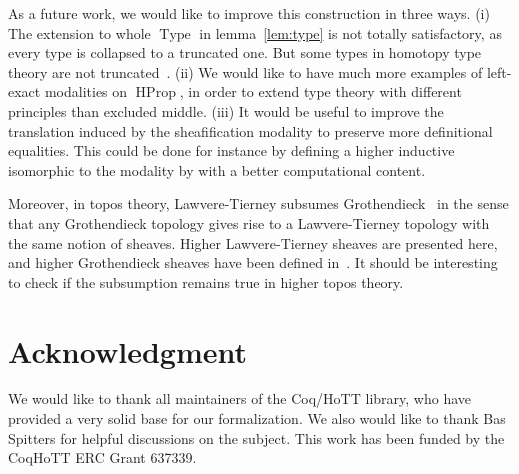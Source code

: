 \documentclass[preprint,9pt,numbers]{sigplanconf}
\newcommand{\mynote}[2]{
    \fbox{\bfseries\sffamily\scriptsize#1}
    {\small$\blacktriangleright$\textsf{\emph{#2}}$\blacktriangleleft$}~}
\newcommand\nt[1]{\mynote{NT}{#1}}
\newcommand{\eg}{e.g,\xspace}
\DeclareMathOperator{\Type}{Type}
\DeclareMathOperator{\HProp}{HProp}
\begin{document}

As a future work, we would like to improve this construction in three
ways.
(i) The extension to whole $\Type$ in lemma~\ref{lem:type} is not
  totally satisfactory, as every type is collapsed to a truncated
  one. But some types in homotopy type theory are not
  truncated~\cite[Example 8.8.6]{hottbook}.
(ii) 
  We would like to have much more examples of left-exact modalities on
  $\HProp$, in order to extend type theory with different principles
  than excluded middle.
(iii) It would be useful to improve the translation induced by the
  sheafification modality to preserve more definitional equalities.
  This could be done for instance by defining a higher inductive
  isomorphic to the modality by with a better computational content. 

Moreover, in topos theory, Lawvere-Tierney subsumes Grothen\-dieck~\cite[Section~V.4]{maclanemoerdijk} in the sense that any
Grothen\-dieck topology gives rise to a Lawvere-Tierney topology with
the same notion of sheaves. Higher Lawvere-Tierney sheaves are
presented here, and higher Grothendieck sheaves have been defined
in~\cite{lurie}. It should be interesting to check if the subsumption
remains true in higher topos theory.



\section*{Acknowledgment}

We would like to thank all maintainers of the Coq/HoTT library, who
have provided a very solid base for our formalization. 
%
We also would like to thank Bas Spitters for helpful discussions on
the subject.
%
This work has been funded by the CoqHoTT ERC Grant 637339.



\end{document}
